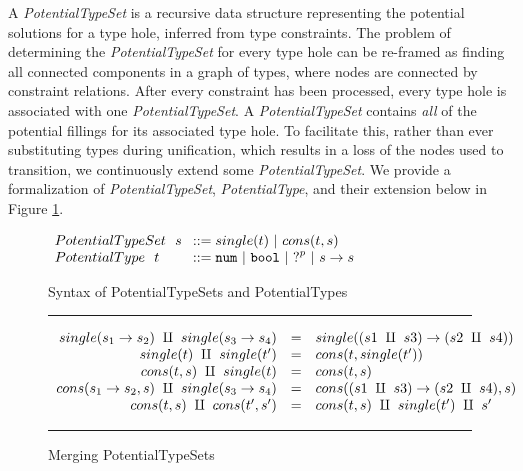 
A \textit{PotentialTypeSet} is a recursive data structure representing the potential solutions for a type hole, inferred from type constraints. The problem of determining the \textit{PotentialTypeSet} for every type hole can be re-framed as finding all connected components in a graph of types, where nodes are connected by constraint relations. After every constraint has been processed, every type hole is associated with one \textit{PotentialTypeSet}. A \emph{PotentialTypeSet} contains \emph{all} of the potential fillings for its associated type hole. To facilitate this, rather than ever substituting types during unification, which results in a loss of the nodes used to transition, we continuously extend some \emph{PotentialTypeSet}. We provide a formalization of \textit{PotentialTypeSet}, \textit{PotentialType}, and their extension below in Figure \ref{fig:possible_type_sets}.

\begin{figure}[h!]
\centering
\vspace{-3px} 
$\arraycolsep=4pt\begin{array}{lll}
PotentialTypeSet~~ s & ::= 
single(t) ~\vert~ 
cons(t, s)
\\
PotentialType~~ t & ::= 
  \tnum ~\vert~
  \tbool ~\vert~
  \tehole^p ~\vert~
  \tarr{s}{s}
  \\
\end{array}$
\label{fig:syntax_possible_type_sets}
\caption{Syntax of PotentialTypeSets and PotentialTypes}
\vspace{5px}
\hrule
\[\begin{array}{rcl}
    single(s_1 \rightarrow s_2) ~\amalg~ single(s_3 \rightarrow s_4) & = & single({(s1 ~\amalg~ s3) \rightarrow (s2 ~\amalg~ s4)}) \\
    single(t) ~\amalg~ single(t') & = & cons(t, single(t')) \\
    cons(t,s) ~\amalg~ single(t) & = & cons(t, s) \\
    cons(s_1 \rightarrow s_2, s) ~\amalg~ single(s_3 \rightarrow s_4) & = & cons((s1 ~\amalg~ s3) \rightarrow (s2 ~\amalg~ s4) , s) \\
    cons(t,s) ~\amalg~ cons(t',s') & = & cons(t,s) ~\amalg~ single(t') ~\amalg~ s' \\
\end{array}\] 
\caption{Merging PotentialTypeSets}
\vspace{5px} 
\hrule
\label{fig:possible_type_sets}
\vspace{-5px}
\end{figure}


